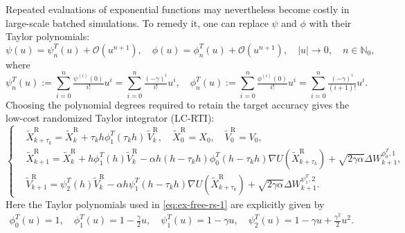 \documentclass[12pt]{article}
\numberwithin{equation}{section}
\begin{document}
Repeated evaluations of exponential functions may nevertheless
become costly in large-scale batched simulations. To remedy it, one can replace $\psi$ and $\phi$ with their
Taylor polynomials:
\begin{equation}
\psi (u) 
= 
\psi_{n}^T  (u) 
+
\mathcal{O}(u^{n+1}),
\quad 
\phi (u) 
= 
\phi_{n}^T  (u) 
+
\mathcal{O}(u^{n+1}),
\quad 
|u| \to 0,
\quad
n \in  \mathbb{N}_0,
\end{equation} 
where 
\begin{equation}
\psi_{n}^T (u) 
:=
\sum_{i=0}^n
\tfrac{\psi^{(i)}(0)}{i!} u^i
=
\sum_{i=0}^n
\tfrac{(-\gamma)^i}{i!} u^i
,
\quad 
\phi_{n}^T  (u) 
:=
\sum_{i=0}^n
\tfrac{\phi^{(i)}(0)}{i!} u^i
=
\sum_{i=0}^n
\tfrac{(-\gamma)^i}{(i+1)!} u^i
.
\end{equation}
Choosing the polynomial degrees required to retain the target
accuracy gives the low-cost randomized Taylor integrator
(LC-RTI):
\begin{equation}
\label{eq:ex-free-rs-1}
\left\{
\begin{aligned}
& \widetilde{X}^{\mathrm{R}}_{k+\tau_k}
=
\widetilde{X}^{\mathrm{R}}_k
+
\tau_k h \phi^T_1(\tau_k h) \, \widetilde{V}^{\mathrm{R}}_k,
\quad 
\widetilde{X}^{\mathrm{R}}_{0}
=
X_0,
\quad 
\widetilde{V}^{\mathrm{R}}_{0}
=
V_0,
\\
&
\widetilde{X}^{\mathrm{R}}_{k+1}
=
\widetilde{X}^{\mathrm{R}}_k
+
h\phi^T_1(h)\widetilde{V}^{\mathrm{R}}_k
-
\alpha h(h-\tau_k h)\phi^T_0(h-\tau_k h)
\nabla U(\widetilde{X}^{\mathrm{R}}_{k+\tau_k})
+
\sqrt{2\gamma\alpha}
\Delta W_{k+1}^{\phi_0^T,1},
\\
&
\widetilde{V}^{\mathrm{R}}_{k+1}
= 
\psi^T_2(h) \widetilde{V}^{\mathrm{R}}_k
-
\alpha h\psi^T_1(h-\tau_k h)
\nabla U(\widetilde{X}^{\mathrm{R}}_{k+\tau_k})
+
\sqrt{2\gamma\alpha}
\Delta W_{k+1}^{\psi_1^T,2}.
\end{aligned}
\right.
\end{equation}
Here the Taylor polynomials used in \eqref{eq:ex-free-rs-1} are explicitly given by
\begin{align}\label{eq:taylor-poly}
\phi_0^T(u)
= 1, 
\quad 
\phi_1^T(u) 
= 
1-\tfrac{\gamma}{2}u, 
\quad
\psi_1^T(u) 
= 1-\gamma u,
\quad
\psi_2^T(u) = 1-\gamma u+\tfrac{\gamma^2}{2}u^2 .
\end{align}
\end{document}
